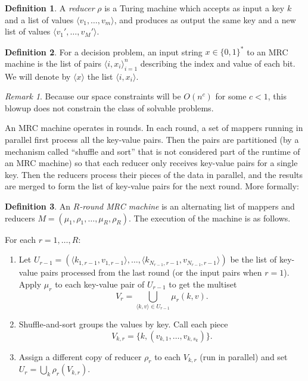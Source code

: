 \documentclass[11pt]{article}
\theoremstyle{definition}
\newtheorem{defn}{Definition}
\theoremstyle{remark}
\newtheorem{remark}{Remark}
\begin{document}
\begin{defn}
A \emph{reducer} $\rho$ is a Turing machine which accepts as input a key $k$
and a list of values $\langle v_1 , \dots, v_m \rangle$, and produces as output
the same key and a new list of values $\langle v_1', \dots, v_M' \rangle$.
\end{defn}

\begin{defn} 
For a decision problem, an input string $x \in \{ 0,1 \}^*$ to an MRC machine
is the list of pairs $\langle i, x_i \rangle_{i=1}^n$ describing the index 
and value of each bit. We will denote by $\langle x \rangle$ the list $\langle
i, x_i \rangle$.
\end{defn}

\begin{remark}
Because our space constraints will be $O(n^c)$ for some $c < 1$, this blowup
does not constrain the class of solvable problems.
\end{remark}

An MRC machine operates in rounds. In each round, a set of mappers running in
parallel first process all the key-value pairs. Then the pairs are partitioned
(by a mechanism called ``shuffle and sort'' that is not considered part of the
runtime of an MRC machine) so that each reducer only receives key-value pairs
for a single key.  Then the reducers process their pieces of the data in
parallel, and the results are merged to form the list of key-value pairs for
the next round. More formally:

\begin{defn} 
An \emph{$R$-round MRC machine} is an alternating list of mappers and reducers
$M = (\mu_1, \rho_1, \dots, \mu_R, \rho_R)$. The execution of the machine is as
follows.

For each $r = 1, \dots, R$:
\begin{enumerate} 
  \item Let $U_{r-1} = (\langle k_{1, r-1}, v_{1, r-1} \rangle, \dots, \langle
k_{N_{r-1}, r-1}, v_{N_{r-1}, r-1} \rangle)$ be the list of key-value pairs
processed from the last round (or the input pairs when $r=1$). Apply $\mu_r$ to
each key-value pair of $U_{r-1}$ to get the multiset $$V_r = \bigcup_{\langle
k,v \rangle \in U_{r-1}} \mu_r(k, v).$$

  \item Shuffle-and-sort groups the values by key. Call each piece $$V_{k,r} =
\{ k, (v_{k,1}, \dots, v_{k,s_k})\}.$$  

  \item Assign a different copy of reducer $\rho_r$ to each $V_{k,r}$ (run in
parallel) and set $U_r = \bigcup_{k}\rho_r(V_{k,r})$.
\end{enumerate}
\end{defn}
\end{document}
